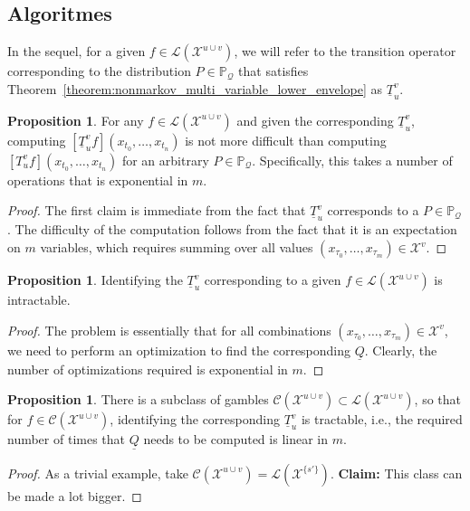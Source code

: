 \documentclass[10pt]{paper}
\theoremstyle{definition}
\newtheorem{proposition}[theorem]{Proposition}
\newcommand{\states}{\mathcal{X}}
\newcommand{\lt}{\underline{T}}
\newcommand{\gambles}{\mathcal{L}}
\newcommand{\lrate}{\underline{Q}}
\begin{document}
\subsection{Algoritmes}\label{sec:tractability}

In the sequel, for a given $f\in\gambles(\states^{u\cup v})$, we will refer to the transition operator corresponding to the distribution $P\in\mathbb{P}_\mathcal{Q}$ that satisfies Theorem~\ref{theorem:nonmarkov_multi_variable_lower_envelope} 
as $\lt_u^v$.

\begin{proposition}
For any $f\in\gambles(\states^{u\cup v})$ and given the corresponding $\lt_u^v$, computing $\left[\lt_u^v f\right](x_{t_0},\ldots,x_{t_n})$ is not more difficult than computing $\left[T_u^v f\right](x_{t_0},\ldots,x_{t_n})$ for an arbitrary $P\in\mathbb{P}_{\mathcal{Q}}$. Specifically, this takes a number of operations that is exponential in $m$.
\end{proposition}
\begin{proof}
The first claim is immediate from the fact that $\lt_u^v$ corresponds to a $P\in\mathbb{P}_\mathcal{Q}$. The difficulty of the computation follows from the fact that it is an expectation on $m$ variables, which requires summing over all values $(x_{\tau_0},\ldots,x_{\tau_m})\in\states^v$.
\end{proof}

\begin{proposition}
Identifying the $\lt_u^v$ corresponding to a given $f\in\gambles(\states^{u\cup v})$ is intractable.
\end{proposition}
\begin{proof}
The problem is essentially that for all combinations $(x_{\tau_0},\ldots,x_{\tau_m})\in\states^v$, we need to perform an optimization to find the corresponding $\lrate$. Clearly, the number of optimizations required is exponential in $m$.
\end{proof}

\begin{proposition}
There is a subclass of gambles $\mathcal{C}(\states^{u\cup v})\subset\gambles(\states^{u\cup v})$, so that for $f\in\mathcal{C}(\states^{u\cup v})$, identifying the corresponding $\lt_u^v$ is tractable, i.e., the required number of times that $\lrate$ needs to be computed is linear in $m$.
\end{proposition}
\begin{proof}
As a trivial example, take $\mathcal{C}(\states^{u\cup v}) = \gambles(\states^{\{s'\}})$. {\bf Claim: } This class can be made a lot bigger.
\end{proof}
\end{document}
